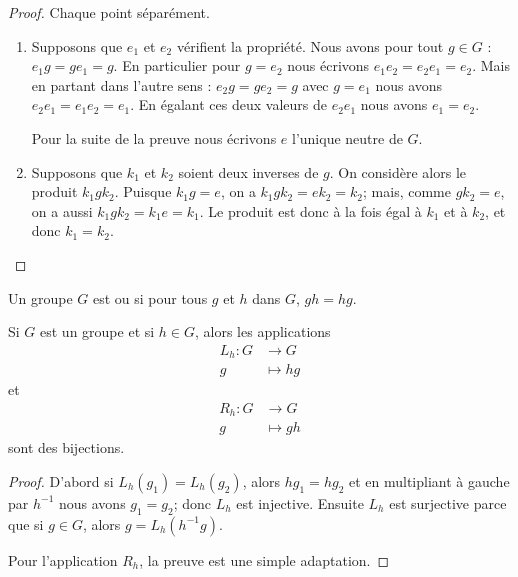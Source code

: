 \begin{proof}
    Chaque point séparément.
    \begin{enumerate}
        \item
            Supposons que \( e_1\) et \( e_2\) vérifient la propriété. Nous avons pour tout \( g\in G\) : \( e_1g=ge_1=g\). En particulier pour \( g=e_2\) nous écrivons \( e_1e_2=e_2e_1=e_2\). Mais en partant dans l'autre sens : \( e_2g=ge_2=g\) avec \( g=e_1\) nous avons \( e_2e_1=e_1e_2=e_1\). En égalant ces deux valeurs de \( e_2e_1\) nous avons \( e_1=e_2\).

            Pour la suite de la preuve nous écrivons \( e\) l'unique neutre de \( G\).

        \item
            Supposons que \( k_1\) et \( k_2\) soient deux inverses de \( g\). On considère alors le produit \( k_1 g k_2 \). Puisque \(k_1 g = e \), on a \( k_1 g k_2 = e k_2 = k_2 \); mais, comme \(g k_2 = e \), on a aussi \( k_1 g k_2 = k_1 e = k_1 \). Le produit est donc à la fois égal à \( k_1 \) et à \( k_2 \), et donc \( k_1 = k_2 \).
    \end{enumerate}
\end{proof}

\begin{definition}
    Un groupe \( G\) est  ou  si pour tous \( g\) et \( h\) dans \( G\), \( gh=hg\).
\end{definition}

\begin{lemma}       \label{LEMooBIBFooBHxFYC}
    Si \( G\) est un groupe et si \( h\in G\), alors les applications
    \begin{equation}
        \begin{aligned}
            L_h\colon G&\to G \\
            g&\mapsto hg 
        \end{aligned}
    \end{equation}
    et
    \begin{equation}
        \begin{aligned}
            R_h\colon G&\to G \\
            g&\mapsto gh 
        \end{aligned}
    \end{equation}
    sont des bijections.
\end{lemma}

\begin{proof}
    D'abord si \( L_h(g_1)=L_h(g_2)\), alors \( hg_1=hg_2\) et en multipliant à gauche par \( h^{-1}\) nous avons \( g_1=g_2\); donc \( L_h\) est injective. Ensuite \( L_h\) est surjective parce que si \( g\in G\), alors \( g=L_h(h^{-1} g)\).

    Pour l'application \( R_h\), la preuve est une simple adaptation.
\end{proof}

